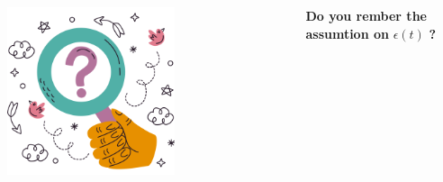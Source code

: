 \documentclass[aspectratio=169,hyperref={pdfpagelabels=false}]{beamer}
\begin{document}
\begin{frame}{}
  \begin{columns}
  \includegraphics[width=0.6\textwidth]{img/pic5.png} \centering
  
    \textbf{Do you rember the assumtion on} $\epsilon(t)$ \textbf{?} \centering \\
    \vspace{2em}
    
  \end{columns}
\end{frame}
\end{document}
